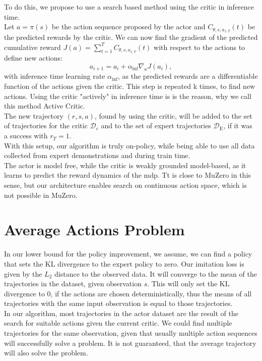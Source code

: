 To do this, we propose to use 
a search based method using the critic in inference time. \\

Let $a = \pi(s)$ be the action sequence proposed by the actor and $C_{\theta, s, a_{1:T}}(t)$ be the predicted rewards by the critic. 
We can now find the gradient of the predicted cumulative reward $J(a) = \sum_{t=1}^{T} C_{\theta, s, a_{1:T}}(t)$ with respect to the actions to define new actions: 
$$a_{i+1} = a_i + \alpha_{\mathrm{inf}} \nabla_{a} J(a_i),$$ 
with inference time learning rate $\alpha_{\mathrm{inf}}$, as the predicted rewards are a differentiable function of the actions given the critic. This step is repeated k times, to find new actions. 
Using the critic "actively" in inference time is is the reason, why we call this method Active Critic.\\ 

The new trajectory $(r, s, a)$, found by using the critic, will 
be added to the set of trajectories for the critic $\mathcal{D}_c$ and to the set of expert trajectories $\mathcal{D}_{\text{E}}$, if it was a success with $r_T = 1$. \\

With this setup, our algorithm is truly on-policy, while being able to use all data collected from expert demonstrations and during train time. \\

The actor is model free, while the critic is weakly grounded model-based, as it learns to predict the reward dynamics of the \ac{mdp}. Tt is close to MuZero \cite{MUZero} in this sense, 
but our architecture enables search on continuous action space, which is not possible in MuZero. 

\section{Average Actions Problem}
\label{avr_action_problem}
In our lower bound for the policy improvement, we assume, we can find a policy that sets the KL divergence to the expert policy to zero. Our imitation loss is given by the $L_2$ distance to the 
observed data. It will converge to the mean of the trajectories in the dataset, given observation $s$. This will only set the KL divergence to 0, if the actions are chosen deterministically, 
thus the means of all trajectories with the same input observation is equal to those trajectories.\\

In our algorithm, most trajectories in the actor dataset are the result of the search for suitable actions given the current critic. We could find
multiple trajectories for the same observation, given that usually multiple action sequences will successfully solve a problem. It is not guaranteed, that the 
average trajectory will also solve the problem.\\ 

